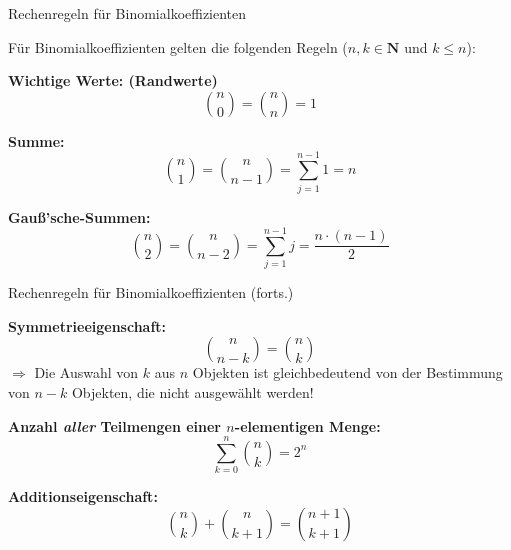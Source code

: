 \documentclass[12pt,ngerman,a4paper,ignorenonframetext,]{beamer}
\begin{document}
\begin{frame}{Rechenregeln für Binomialkoeffizienten}
\protect\hypertarget{rechenregeln-fur-binomialkoeffizienten}{}

Für Binomialkoeffizienten gelten die folgenden Regeln
(\(n,k \in \mathbf{N}\) und \(k \leq n\)):

\textbf{Wichtige Werte: (Randwerte)} \begin{equation*}
    \binom{n}{0} = \binom{n}{n} = 1
\end{equation*}

\textbf{Summe:} \begin{equation*}
    \binom{n}{1} = \binom{n}{n-1} =  \sum_{j=1}^{n-1} 1 = n
\end{equation*}

\textbf{Gauß'sche-Summen:} \begin{equation*}
    \binom{n}{2} = \binom{n}{n-2} = \sum_{j=1}^{n-1} j =  \frac{n\cdot(n-1)}{2}
\end{equation*}

\end{frame}

\begin{frame}{Rechenregeln für Binomialkoeffizienten (forts.)}
\protect\hypertarget{rechenregeln-fur-binomialkoeffizienten-forts.}{}

\textbf{Symmetrieeigenschaft:} \begin{equation*}
    \binom{n}{n-k} = \binom{n}{k} 
\end{equation*} \(\Longrightarrow\) Die Auswahl von \(k\) aus \(n\)
Objekten ist gleichbedeutend von der Bestimmung von \(n-k\) Objekten,
die nicht ausgewählt werden!

\textbf{Anzahl \textit{aller} Teilmengen einer $n$-elementigen Menge:}
\begin{equation*}
    \sum_{k=0}^{n} \binom{n}{k} = 2^n
\end{equation*}

\textbf{Additionseigenschaft:} \begin{equation*}
    \binom{n}{k} + \binom{n}{k+1} = \binom{n+1}{k+1} 
\end{equation*}

\end{frame}
\end{document}
